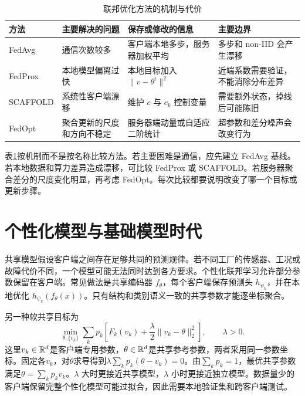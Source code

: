 \begin{table}[htbp]
\centering
\caption{联邦优化方法的机制与代价}
\label{tab:federated-method-constraints}
\scriptsize
\begin{tabular}{m{1.7cm}m{2.5cm}m{2.7cm}m{2.5cm}}
\toprule
方法 & 主要解决的问题 & 保存或修改的信息 & 主要边界 \\
\midrule
FedAvg & 通信次数较多 & 客户端本地多步，服务器加权平均 & 多步和 non-IID 会产生漂移 \\
FedProx & 本地模型偏离过快 & 本地目标加入 $\|v-\theta^t\|^2$ & 近端系数需要验证，不能消除分布差异 \\
SCAFFOLD & 系统性客户端漂移 & 维护 $c$ 与 $c_k$ 控制变量 & 需要额外状态，掉线后可能陈旧 \\
FedOpt & 聚合更新的尺度和方向不稳定 & 服务器端动量或自适应二阶统计 & 超参数和差分噪声会改变行为 \\
\bottomrule
\end{tabular}
\end{table}

表\ref{tab:federated-method-constraints}按机制而不是按名称比较方法。若主要困难是通信，应先建立 FedAvg 基线。若本地数据和算力差异造成漂移，可比较 FedProx 或 SCAFFOLD。若服务器聚合差分的尺度变化明显，再考虑 FedOpt。每次比较都要说明改变了哪一个目标或更新步骤。

\section{个性化模型与基础模型时代}

共享模型假设客户端之间存在足够共同的预测规律。若不同工厂的传感器、工况或故障代价不同，一个模型可能无法同时达到各方要求。个性化联邦学习允许部分参数保留在客户端。常见做法是共享编码器 $f_\theta$，每个客户端保存预测头 $h_{\psi_k}$，并在本地优化 $h_{\psi_k}(f_\theta(x))$。只有结构和类别语义一致的共享参数才能逐坐标聚合。

另一种软共享目标为
\begin{equation}
 \min_{\theta,\{v_k\}}\sum_kp_k\left[F_k(v_k)+\frac{\lambda}{2}\|v_k-\theta\|_2^2\right],
 \qquad \lambda>0.
 \label{eq:personalized-federated-objective-rewrite}
\end{equation}
这里$v_k\in\mathbb{R}^d$是客户端专用参数，$\theta\in\mathbb{R}^d$是共享参考参数，两者采用同一参数坐标。固定各$v_k$，对$\theta$求导得到$\lambda\sum_kp_k(\theta-v_k)=0$。由$\sum_kp_k=1$，最优共享参数满足$\theta=\sum_kp_kv_k$。$\lambda$ 大时更接近共享模型，$\lambda$ 小时更接近独立模型。数据量少的客户端保留完整个性化模型可能过拟合，因此需要本地验证集和跨客户端测试。


